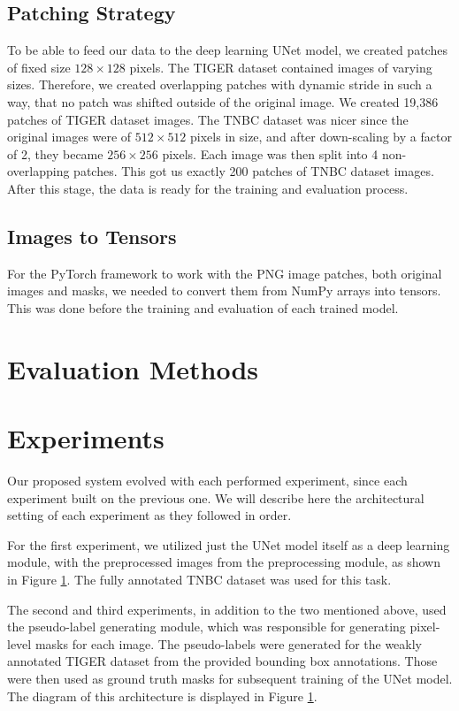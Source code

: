\subsection{Patching Strategy}
To be able to feed our data to the deep learning UNet model, we created patches of fixed size $128\times128$ pixels. The TIGER dataset contained images of varying sizes. Therefore, we created overlapping patches with dynamic stride in such a way, that no patch was shifted outside of the original image. We created 19,386 patches of TIGER dataset images. The TNBC dataset was nicer since the original images were of $512\times512$ pixels in size, and after down-scaling by a factor of 2, they became $256\times256$ pixels. Each image was then split into 4 non-overlapping patches. This got us exactly 200 patches of TNBC dataset images. After this stage, the data is ready for the training and evaluation process.

\subsection{Images to Tensors}
For the PyTorch framework to work with the PNG image patches, both original images and masks, we needed to convert them from NumPy arrays into tensors. This was done before the training and evaluation of each trained model.

\section{Evaluation Methods}

\section{Experiments}
\label{section:experiments}
Our proposed system evolved with each performed experiment, since each experiment built on the previous one. We will describe here the architectural setting of each experiment as they followed in order. 

For the first experiment, we utilized just the UNet model itself as a deep learning module, with the preprocessed images from the preprocessing module, as shown in Figure \ref{}. The fully annotated TNBC dataset was used for this task.

The second and third experiments, in addition to the two mentioned above, used the pseudo-label generating module, which was responsible for generating pixel-level masks for each image. The pseudo-labels were generated for the weakly annotated TIGER dataset from the provided bounding box annotations. Those were then used as ground truth masks for subsequent training of the UNet model. The diagram of this architecture is displayed in Figure \ref{}.


